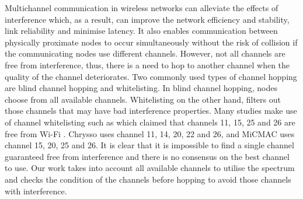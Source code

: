 Multichannel communication in wireless networks can alleviate the effects of interference which, as a result, can improve the network efficiency and stability, link reliability and minimise latency. It also enables communication between physically proximate nodes to occur simultaneously without the risk of collision if the communicating nodes use different channels. However, not all channels are free from interference, thus, there is a need to hop to another channel when the quality of the channel deteriorates. Two commonly used types of channel hopping \cite{watteyne} are blind channel hopping and whitelisting. In blind channel hopping, nodes choose from all available channels. Whitelisting on the other hand, filters out those channels that may have bad interference properties. Many studies make use of channel whitelisting such as \cite{watteyne} which claimed that channels 11, 15, 25 and 26 are free from Wi-Fi \cite{wu}. Chrysso \cite{chrysso} uses channel 11, 14, 20, 22 and 26, and MiCMAC \cite{micmac} uses channel 15, 20, 25 and 26. It is clear that it 
is impossible to find a single channel guaranteed free from interference and there is no consensus on the best channel to use. Our work takes into account all available channels to utilise the spectrum and checks the condition of the channels before hopping to avoid those channels with interference.





